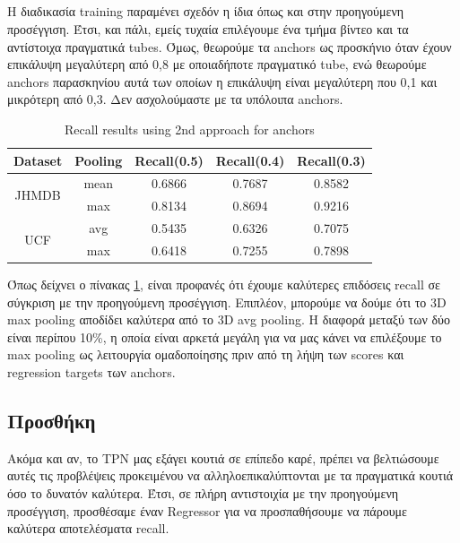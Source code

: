 \subsection{}
Η διαδικασία \en training \gr παραμένει σχεδόν η ίδια όπως και στην προηγούμενη προσέγγιση. Έτσι, και πάλι, εμείς τυχαία επιλέγουμε ένα τμήμα βίντεο και τα αντίστοιχα πραγματικά \en tubes\gr. Όμως,
θεωρούμε τα \en anchors \gr ως προσκήνιο όταν έχουν επικάλυψη  μεγαλύτερη από 0,8 με οποιαδήποτε πραγματικό \en tube\gr, ενώ θεωρούμε \en anchors \gr παρασκηνίου αυτά  των οποίων η επικάλυψη
είναι μεγαλύτερη που 0,1 και μικρότερη από 0,3. Δεν ασχολούμαστε με τα υπόλοιπα \en anchors\gr. 

\en
\begin{table}[h]
  \centering
  \begin{tabular}{||c | c || c  c c||}
    \hline
    \textbf{Dataset} & \textbf{Pooling} &  \textbf{Recall(0.5)} & \textbf{Recall(0.4)} & \textbf{Recall(0.3)} \\
    \hline  \hline
    \multirow{2}{4em}{JHMDB} & mean & 0.6866 & 0.7687 & 0.8582 \\
    \cline{2-5}
    {} & max &  0.8134 & 0.8694 & 0.9216 \\
    \hline
    \multirow{2}{4em}{UCF} & avg &  0.5435 & 0.6326 & 0.7075 \\
    \cline{2-5}
    {} & max & 0.6418 & 0.7255 & 0.7898 \\
    \hline
  \end{tabular}
  \caption{\en Recall results using 2nd approach for anchors}
  \label{table:gr_tpn_2_1}
\end{table}
\gr


Όπως δείχνει ο πίνακας \ref{table:gr_tpn_2_1}, είναι προφανές ότι έχουμε καλύτερες επιδόσεις \en recall \gr σε σύγκριση με την προηγούμενη προσέγγιση.
Επιπλέον, μπορούμε να δούμε ότι το \en 3D max pooling \gr  αποδίδει καλύτερα από το \en 3D avg pooling\gr. Η διαφορά
μεταξύ των δύο είναι περίπου 10\%, η οποία είναι αρκετά μεγάλη για να μας κάνει να επιλέξουμε το \en max pooling \gr ως λειτουργία ομαδοποίησης πριν από τη
λήψη των \en scores \gr και \en regression targets \gr των \en anchors\gr.

\gr
\subsection{\gr Προσθήκη }

Ακόμα και αν, το  \en TPN \gr μας εξάγει κουτιά σε επίπεδο καρέ, πρέπει να βελτιώσουμε αυτές τις προβλέψεις προκειμένου να αλληλοεπικαλύπτονται
με τα πραγματικά κουτιά  όσο το δυνατόν καλύτερα.
Έτσι, σε πλήρη αντιστοιχία με την προηγούμενη προσέγγιση, προσθέσαμε έναν \en Regressor \gr για να προσπαθήσουμε να πάρουμε καλύτερα αποτελέσματα \en recall\gr.

